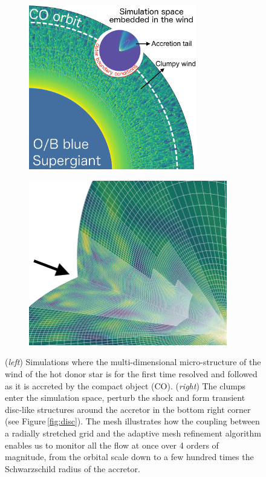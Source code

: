 \documentclass[letterpaper,12pt,onecolumn]{article}
\begin{document}
\begin{figure}[!t]
  \hspace*{-1.7cm}
\begin{subfigure}{0.45\columnwidth}
  \includegraphics[height=7.2cm]{Figures/config_SgXB_clumps.png}	
\end{subfigure}%
\begin{subfigure}{0.45\columnwidth}
  \hspace*{0.7cm}
  \includegraphics[height=7.2cm]{Figures/mesh.jpeg}	
\end{subfigure}
\caption{(\textit{left}) Simulations where the multi-dimensional micro-structure of the wind of the hot donor star is for the first time resolved and followed as it is accreted by the compact object (CO). (\textit{right}) The clumps enter the simulation space, perturb the shock and form transient disc-like structures around the accretor in the bottom right corner (see Figure\,\ref{fig:disc}). The mesh illustrates how the coupling between a radially stretched grid and the adaptive mesh refinement algorithm enables us to monitor all the flow at once over 4 orders of magnitude, from the orbital scale down to a few hundred times the Schwarzschild radius of the accretor.}
\label{fig:config_SgXB_and_mesh}
\end{figure}
\end{document}
